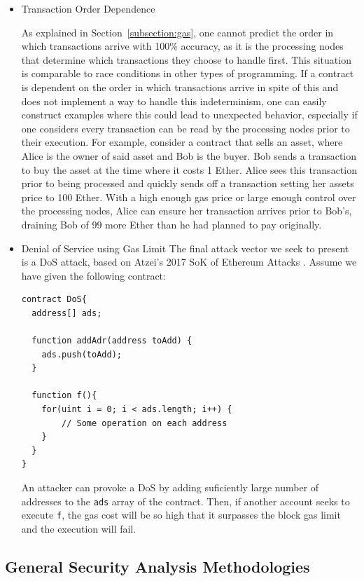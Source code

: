 \documentclass[letterpaper,twocolumn,10pt]{article}
\begin{document}
\begin{itemize}
    \item Transaction Order Dependence

    As explained in Section~\ref{subsection:gas}, one cannot predict the order in which transactions arrive with 100\% accuracy, as it is the processing nodes that determine which transactions they choose to handle first. This situation is comparable to race conditions in other types of programming. If a contract is dependent on the order in which transactions arrive in spite of this and does not implement a way to handle this indeterminism, one can easily construct examples where this could lead to unexpected behavior, especially if one considers every transaction can be read by the processing nodes prior to their execution. For example, consider a contract that sells an asset, where Alice is the owner of said asset and Bob is the buyer. Bob sends a transaction to buy the asset at the time where it costs 1 Ether. Alice sees this transaction prior to being processed and quickly sends off a transaction setting her assets price to 100 Ether. With a high enough gas price or large enough control over the processing nodes, Alice can ensure her transaction arrives prior to Bob's, draining Bob of 99 more Ether than he had planned to pay originally.
    
    


	\item Denial of Service using Gas Limit
	The final attack vector we seek to present is a DoS attack, based on Atzei's 2017 SoK of Ethereum Attacks \cite{atzei_bartoletti_cimoli_2017}. Assume we have given the following contract:
	
\begin{verbatim}
contract DoS{
  address[] ads;

  function addAdr(address toAdd) { 
    ads.push(toAdd);
  }

  function f(){
    for(uint i = 0; i < ads.length; i++) { 
        // Some operation on each address
    }
  }
}
\end{verbatim}

An attacker can provoke a DoS by adding suficiently large number of addresses to the \verb|ads| array of the contract. Then, if another account seeks to execute \verb|f|, the gas cost will be so high that it surpasses the block gas limit and the execution will fail.
  
  \end{itemize}

\subsection{General Security Analysis Methodologies}
\end{document}
